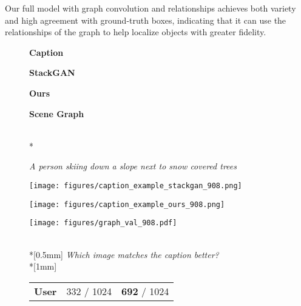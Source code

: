 \documentclass[10pt,twocolumn,letterpaper]{article}
\begin{document}
Our full model with graph convolution and relationships achieves both variety and 
high agreement with ground-truth boxes, indicating that it can use the
relationships of the graph to help localize objects with greater fidelity.

\begin{figure}
  \centering
  \begin{minipage}{0.09\textwidth}
    \centering
    \textbf{Caption}
  \end{minipage}
  \begin{minipage}{0.11\textwidth}
    \centering
    \textbf{StackGAN~\cite{zhang2017stackgan}}
  \end{minipage}
  \begin{minipage}{0.11\textwidth}
    \centering
    \textbf{Ours}
  \end{minipage}
  \begin{minipage}{0.115\textwidth}
    \centering
    \textbf{Scene Graph}
  \end{minipage} \\*
  \begin{minipage}[b]{0.09\textwidth}
    \centering
    \footnotesize
    \textit{A person skiing down a slope next to snow covered trees}
    \vspace{2mm}
  \end{minipage}
  \begin{minipage}[t]{0.11\textwidth}
    \texttt{[image: figures/caption\_example\_stackgan\_908.png]}
  \end{minipage}
  \begin{minipage}[t]{0.11\textwidth}
    \texttt{[image: figures/caption\_example\_ours\_908.png]}
  \end{minipage}
  \begin{minipage}[b]{0.115\textwidth}
    \centering
    \texttt{[image: figures/graph\_val\_908.pdf]}
  \end{minipage} \\*[0.5mm]
  {\footnotesize
    \hspace{-4mm} \emph{Which image matches the caption better?} \\*[1mm]
  }
  \hspace*{-14.5mm}\begin{tabular}{c|c|c}
    \hline
    \textbf{User}  & \hspace{1mm} 332 / 1024 \hspace{1mm} & \hspace{1mm} \textbf{692} / 1024 \hspace{1mm} \\

\end{tabular}
\end{figure}
\end{document}
